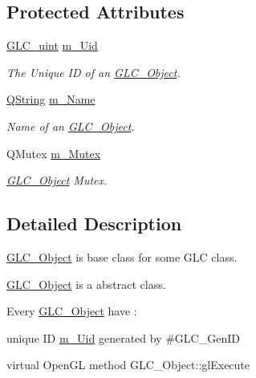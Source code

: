 \subsection*{Protected Attributes}
\begin{DoxyCompactItemize}
\item 
\hyperlink{glc__global_8h_abf950976fabed69026558df8e2da6c6b}{G\-L\-C\-\_\-uint} \hyperlink{class_g_l_c___object_a6e7849a0927cfba751cebcb3f6c469a8}{m\-\_\-\-Uid}
\begin{DoxyCompactList}\small\item\em The Unique I\-D of an \hyperlink{class_g_l_c___object}{G\-L\-C\-\_\-\-Object}. \end{DoxyCompactList}\item 
\hyperlink{group___u_a_v_objects_plugin_gab9d252f49c333c94a72f97ce3105a32d}{Q\-String} \hyperlink{class_g_l_c___object_a33dc5c2f59f90204cf611a202501f26b}{m\-\_\-\-Name}
\begin{DoxyCompactList}\small\item\em Name of an \hyperlink{class_g_l_c___object}{G\-L\-C\-\_\-\-Object}. \end{DoxyCompactList}\item 
Q\-Mutex \hyperlink{class_g_l_c___object_a16e46766aa3ce2f2a2d2340f658060c7}{m\-\_\-\-Mutex}
\begin{DoxyCompactList}\small\item\em \hyperlink{class_g_l_c___object}{G\-L\-C\-\_\-\-Object} Mutex. \end{DoxyCompactList}\end{DoxyCompactItemize}


\subsection{Detailed Description}
\hyperlink{class_g_l_c___object}{G\-L\-C\-\_\-\-Object} is base class for some G\-L\-C class. 

\hyperlink{class_g_l_c___object}{G\-L\-C\-\_\-\-Object} is a abstract class. \par
 \par
 Every \hyperlink{class_g_l_c___object}{G\-L\-C\-\_\-\-Object} have \-:
\begin{DoxyItemize}
\item unique I\-D \hyperlink{class_g_l_c___object_a6e7849a0927cfba751cebcb3f6c469a8}{m\-\_\-\-Uid} generated by \#\-G\-L\-C\-\_\-\-Gen\-I\-D
\item virtual Open\-G\-L method G\-L\-C\-\_\-\-Object\-::gl\-Execute 
\end{DoxyItemize}

